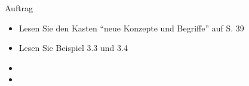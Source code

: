 \begin{frame}[fragile]{Auftrag}
\begin{itemize}
\item Lesen Sie den Kasten ``neue Konzepte und Begriffe'' auf S. 39
\item Lesen Sie Beispiel 3.3 und 3.4
\item {}
\item {}
\end{itemize}

\end{frame}